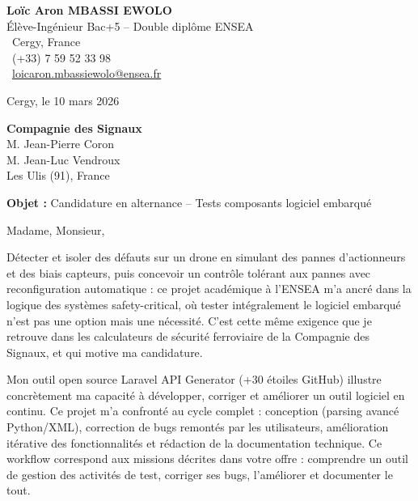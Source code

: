 \documentclass[a4paper,11pt]{article}
\begin{document}
\noindent
\begin{minipage}[t]{0.5\textwidth}
    \textbf{Loïc Aron MBASSI EWOLO}\\
    Élève-Ingénieur Bac+5 -- Double diplôme ENSEA\\[3pt]
    \faMapMarker\ Cergy, France\\
    \faPhone\ (+33) 7 59 52 33 98\\
    \faEnvelope\ \href{mailto:loicaron.mbassiewolo@ensea.fr}{loicaron.mbassiewolo@ensea.fr}
\end{minipage}
\hfill
\begin{minipage}[t]{0.4\textwidth}
    \raggedleft
    Cergy, le 10 mars 2026
\end{minipage}

\vspace{1.2cm}

\hfill
\begin{minipage}[t]{0.5\textwidth}
    \raggedleft
    \textbf{Compagnie des Signaux}\\
    M. Jean-Pierre Coron\\
    M. Jean-Luc Vendroux\\
    Les Ulis (91), France
\end{minipage}

\vspace{1cm}

\noindent\textbf{Objet :} Candidature en alternance -- Tests composants logiciel embarqué

\vspace{0.8cm}

Madame, Monsieur,

Détecter et isoler des défauts sur un drone en simulant des pannes d'actionneurs et des biais capteurs, puis concevoir un contrôle tolérant aux pannes avec reconfiguration automatique : ce projet académique à l'ENSEA m'a ancré dans la logique des systèmes safety-critical, où tester intégralement le logiciel embarqué n'est pas une option mais une nécessité. C'est cette même exigence que je retrouve dans les calculateurs de sécurité ferroviaire de la Compagnie des Signaux, et qui motive ma candidature.

Mon outil open source Laravel API Generator (+30 étoiles GitHub) illustre concrètement ma capacité à développer, corriger et améliorer un outil logiciel en continu. Ce projet m'a confronté au cycle complet : conception (parsing avancé Python/XML), correction de bugs remontés par les utilisateurs, amélioration itérative des fonctionnalités et rédaction de la documentation technique. Ce workflow correspond aux missions décrites dans votre offre : comprendre un outil de gestion des activités de test, corriger ses bugs, l'améliorer et documenter le tout.
\end{document}
